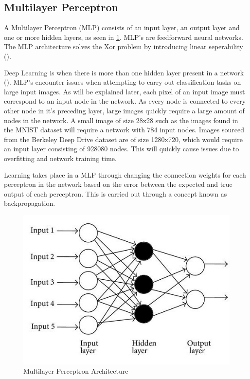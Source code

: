 \documentclass[12pt]{report}
\begin{document}
\subsection{Multilayer Perceptron}
\begin{flushleft}
A Multilayer Perceptron (MLP) consists of an input layer, an output layer and one or more hidden layers, as seen in \ref{fig:mlp}. MLP's are feedforward neural networks. The MLP architecture solves the Xor problem by introducing linear seperability (\cite{Singh2016MinimumCM}).

Deep Learning is when there is more than one hidden layer present in a network (\cite{o2015introduction}). MLP's encounter issues when attempting to carry out classification tasks on large input images. As will be explained later, each pixel of an input image must correspond to an input node in the network. As every node is connected to every other node in it's preceding layer, large images quickly require a large amount of nodes in the network. A small image of size 28x28 such as the images found in the MNIST dataset will require a network with 784 input nodes. Images sourced from the Berkeley Deep Drive dataset are of size 1280x720, which would require an input layer consisting of 928080 nodes. This will quickly cause issues due to overfitting and network training time.

Learning takes place in a MLP through changing the connection weights for each perceptron in the network based on the error between the expected and true output of each perceptron. This is carried out through a concept known as backpropagation.
\end{flushleft}

\vspace{0.5cm}
\begin{figure}[ht!]
	\centering
	\includegraphics[width=12cm]{mlp}
	\caption{Multilayer Perceptron Architecture}
	\label{fig:mlp}
\end{figure}
\end{document}
